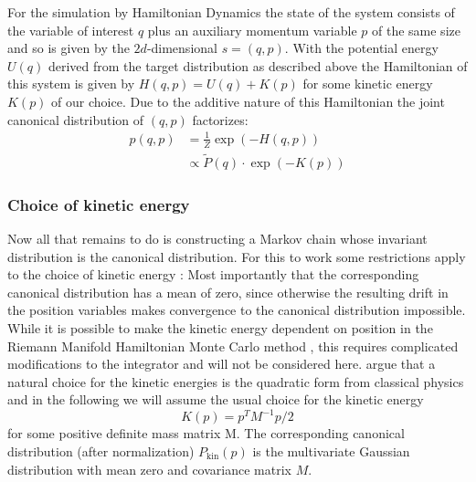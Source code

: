 For the simulation by Hamiltonian Dynamics the state of the system consists of the variable of interest $q$ plus an auxiliary momentum variable $p$ of the same size and so is given by the $2d$-dimensional $s = (q, p)$. With the potential energy $U(q)$ derived from the target distribution as described above the Hamiltonian of this system is given by $H(q, p) = U(q) + K(p)$ for some kinetic energy $K(p)$ of our choice. Due to the additive nature of this Hamiltonian the joint canonical distribution of $(q, p)$ factorizes:
\begin{equation}
\begin{split}
p(q, p) &= \frac{1}{Z} \exp \left( -H(q, p) \right) \\
			&\propto \tilde{P}(q) \cdot \exp{(-K(p))}
\end{split}
\end{equation}

\subsubsection{Choice of kinetic energy}
Now all that remains to do is constructing a Markov chain whose invariant distribution is the canonical distribution. For this to work some restrictions apply to the choice of kinetic energy \parencite{Betancourt2014}: Most importantly that the corresponding canonical distribution has a mean of zero, since otherwise the resulting drift in the position variables makes convergence to the canonical distribution impossible. While it is possible to make the kinetic energy dependent on position in the Riemann Manifold Hamiltonian Monte Carlo method \parencite{Girolami2011}, this requires complicated modifications to the integrator and will not be considered here. \textcite{Betancourt2014} argue that a natural choice for the kinetic energies is the quadratic form from classical physics and in the following we will assume the usual choice for the kinetic energy
\begin{equation} \label{eq:KineticEnergy}
K(p) = p^T M^{-1} p/2
\end{equation}
for some positive definite mass matrix M. The corresponding canonical distribution (after normalization) $P_\textrm{kin}(p)$ is the multivariate Gaussian distribution with mean zero and covariance matrix $M$.

